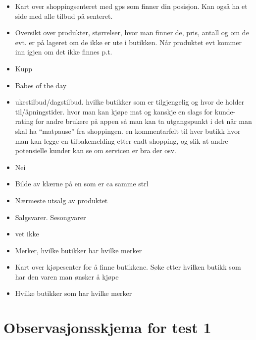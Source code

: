 \begin{itemize}
    \item Kart over shoppingsenteret med gps som finner din posisjon. Kan også ha et side med alle tilbud på senteret.
    \item Oversikt over produkter, størrelser, hvor man finner de, pris, antall og om de evt. er på lageret om de ikke er ute i butikken. Når produktet evt kommer inn igjen om det ikke finnes p.t.
    \item Kupp
    \item Babes of the day
    \item ukestilbud/dagstilbud. hvilke butikker som er tilgjengelig og hvor de holder til/åpningstider. hvor man kan kjøpe mat og kanskje en slags for kunde-rating for andre brukere på appen så man kan ta utgangspunkt i det når man skal ha “matpause” fra shoppingen. en kommentarfelt til hver butikk hvor man kan legge en tilbakemelding etter endt shopping, og slik at andre potensielle kunder kan se om servicen er bra der osv.
    \item Nei
    \item Bilde av klærne på en som er ca samme strl
    \item Nærmeste utsalg av produktet
    \item Salgsvarer. Sesongvarer
    \item vet ikke
    \item Merker, hvilke butikker har hvilke merker
    \item Kart over kjøpesenter for å finne butikkene. Søke etter hvilken butikk som har den varen man ønsker å kjøpe
    \item Hvilke butikker som har hvilke merker
\end{itemize}

\newpage
\section{\textcolor[HTML]{D32F2F}{Observasjonsskjema for test 1}} \label{App:AppendixB}

